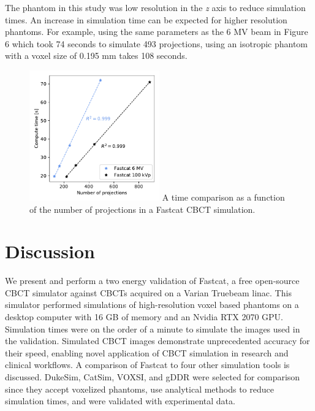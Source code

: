 The phantom in this study was low resolution in the \textit{z} axis to reduce simulation times. An increase in simulation time can be expected for higher resolution phantoms. For example, using the same parameters as the 6 MV beam in Figure 6 which took 74 seconds to simulate 493 projections, using an isotropic phantom with a voxel size of 0.195 mm takes 108 seconds.

\begin{figure}[h!]
  \begin{center}
 
  \includegraphics[width=0.5\textwidth, clip]{figures/speed.pdf}
  {A time comparison as a function of the number of projections in a Fastcat CBCT simulation. 
 \label{speed} 
    }  %
    \end{center}
\end{figure}
\section{Discussion}

We present and perform a two energy validation of Fastcat, a free open-source CBCT simulator against CBCTs acquired on a Varian Truebeam linac. This simulator performed simulations of high-resolution voxel based phantoms on a desktop computer with 16 GB of memory and an Nvidia RTX 2070 GPU. Simulation times were on the order of a minute to simulate the images used in the validation. Simulated CBCT images demonstrate unprecedented accuracy for their speed, enabling novel application of CBCT simulation in research and clinical workflows. A comparison of Fastcat to four other simulation tools is discussed. DukeSim, CatSim, VOXSI, and gDDR were selected for comparison since they accept voxelized phantoms, use analytical methods to reduce simulation times, and were validated with experimental data.

